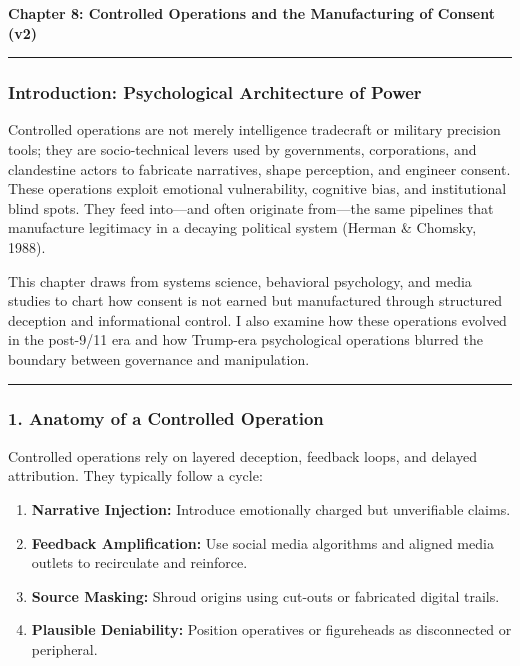 \documentclass[
]{article}
\author{}
\date{}
\providecommand{\tightlist}{%
  \setlength{\itemsep}{0pt}\setlength{\parskip}{0pt}}
\begin{document}
\textbf{Chapter 8: Controlled Operations and the Manufacturing of Consent (v2)}

\begin{center}\rule{0.5\linewidth}{0.5pt}\end{center}

\subsubsection{Introduction: Psychological Architecture of Power}\label{introduction-psychological-architecture-of-power}

Controlled operations are not merely intelligence tradecraft or military precision tools; they are socio-technical levers used by governments, corporations, and clandestine actors to fabricate narratives, shape perception, and engineer consent. These operations exploit emotional vulnerability, cognitive bias, and institutional blind spots. They feed into---and often originate from---the same pipelines that manufacture legitimacy in a decaying political system (Herman \& Chomsky, 1988).

This chapter draws from systems science, behavioral psychology, and media studies to chart how consent is not earned but manufactured through structured deception and informational control. I also examine how these operations evolved in the post-9/11 era and how Trump-era psychological operations blurred the boundary between governance and manipulation.

\begin{center}\rule{0.5\linewidth}{0.5pt}\end{center}

\subsubsection{1. Anatomy of a Controlled Operation}\label{anatomy-of-a-controlled-operation}

Controlled operations rely on layered deception, feedback loops, and delayed attribution. They typically follow a cycle:

\begin{enumerate}
\def\labelenumi{\arabic{enumi}.}
\tightlist
\item
  \textbf{Narrative Injection:} Introduce emotionally charged but unverifiable claims.
\item
  \textbf{Feedback Amplification:} Use social media algorithms and aligned media outlets to recirculate and reinforce.
\item
  \textbf{Source Masking:} Shroud origins using cut-outs or fabricated digital trails.
\item
  \textbf{Plausible Deniability:} Position operatives or figureheads as disconnected or peripheral.
\end{enumerate}
\end{document}
